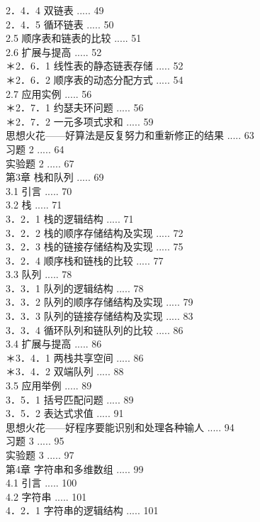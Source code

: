 \documentclass[10pt]{article}
\begin{document}
2．4．4 双链表 ..... 49\\
2．4．5 循环链表 ..... 50\\
2.5 顺序表和链表的比较 ..... 51\\
2.6 扩展与提高 ..... 52\\
＊2．6．1 线性表的静态链表存储 ..... 52\\
＊2．6．2 顺序表的动态分配方式 ..... 54\\
2.7 应用实例 ..... 56\\
＊2．7．1 约瑟夫环问题 ..... 56\\
＊2．7．2 一元多项式求和 ..... 59\\
思想火花——好算法是反复努力和重新修正的结果 ..... 63\\
习题 2 ..... 64\\
实验题 2 ..... 67\\
第3章 栈和队列 ..... 69\\
3.1 引言 ..... 70\\
3.2 栈 ..... 71\\
3．2．1 栈的逻辑结构 ..... 71\\
3．2．2 栈的顺序存储结构及实现 ..... 72\\
3．2．3 栈的链接存储结构及实现 ..... 75\\
3．2．4 顺序栈和链栈的比较 ..... 77\\
3.3 队列 ..... 78\\
3．3．1 队列的逻辑结构 ..... 78\\
3．3．2 队列的顺序存储结构及实现 ..... 79\\
3．3．3 队列的链接存储结构及实现 ..... 83\\
3．3．4 循环队列和链队列的比较 ..... 86\\
3.4 扩展与提高 ..... 86\\
＊3．4．1 两栈共享空间 ..... 86\\
＊3．4．2 双端队列 ..... 88\\
3.5 应用举例 ..... 89\\
3．5．1 括号匹配问题 ..... 89\\
3．5．2 表达式求值 ..... 91\\
思想火花——好程序要能识别和处理各种输人 ..... 94\\
习题 3 ..... 95\\
实验题 3 ..... 97\\
第4章 字符串和多维数组 ..... 99\\
4.1 引言 ..... 100\\
4.2 字符串 ..... 101\\
4．2．1 字符串的逻辑结构 ..... 101\\
\end{document}
